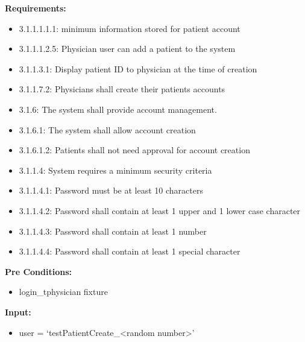 \documentclass[letterpaper,10pt,english]{sphinxmanual}
\begin{document}
\begin{fulllineitems}
\label{STD/test_create_account:test_create_account.test_create_patient}
\textbf{Requirements:}
\begin{itemize}
\item {} 
3.1.1.1.1.1: minimum information stored for patient account

\item {} 
3.1.1.1.2.5: Physician user can add a patient to the system

\item {} 
3.1.1.3.1: Display patient ID to physician at the time of creation

\item {} 
3.1.1.7.2: Physicians shall create their patients accounts

\item {} 
3.1.6: The system shall provide account management.

\item {} 
3.1.6.1: The system shall allow account creation

\item {} 
3.1.6.1.2: Patients shall not need approval for account creation

\item {} 
3.1.1.4: System requires a minimum security criteria

\item {} 
3.1.1.4.1: Password must be at least 10 characters

\item {} 
3.1.1.4.2: Password shall contain at least 1 upper and 1 lower case character

\item {} 
3.1.1.4.3: Password shall contain at least 1 number

\item {} 
3.1.1.4.4: Password shall contain at least 1 special character

\end{itemize}

\textbf{Pre Conditions:}
\begin{itemize}
\item {} 
login\_tphysician fixture

\end{itemize}

\textbf{Input:}
\begin{itemize}
\item {} 
user = `testPatientCreate\_\textless{}random number\textgreater{}'


\end{itemize}
\end{fulllineitems}
\end{document}

